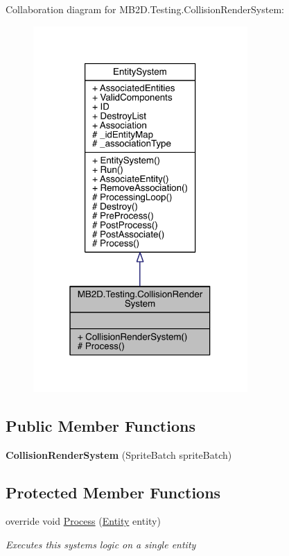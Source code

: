 Collaboration diagram for M\+B2\+D.\+Testing.\+Collision\+Render\+System\+:\nopagebreak
\begin{figure}[H]
\begin{center}
\leavevmode
\includegraphics[width=232pt]{class_m_b2_d_1_1_testing_1_1_collision_render_system__coll__graph}
\end{center}
\end{figure}
\subsection*{Public Member Functions}
\begin{DoxyCompactItemize}
\item 
\hypertarget{class_m_b2_d_1_1_testing_1_1_collision_render_system_a6fc7755e518e6138a5b02f5af7d7e460}{}\label{class_m_b2_d_1_1_testing_1_1_collision_render_system_a6fc7755e518e6138a5b02f5af7d7e460} 
{\bfseries Collision\+Render\+System} (Sprite\+Batch sprite\+Batch)
\end{DoxyCompactItemize}
\subsection*{Protected Member Functions}
\begin{DoxyCompactItemize}
\item 
override void \hyperlink{class_m_b2_d_1_1_testing_1_1_collision_render_system_af7b7ffdb316533a084e98cbea97a096f}{Process} (\hyperlink{class_m_b2_d_1_1_entity_component_1_1_entity}{Entity} entity)
\begin{DoxyCompactList}\small\item\em Executes this systems logic on a single entity \end{DoxyCompactList}\end{DoxyCompactItemize}
